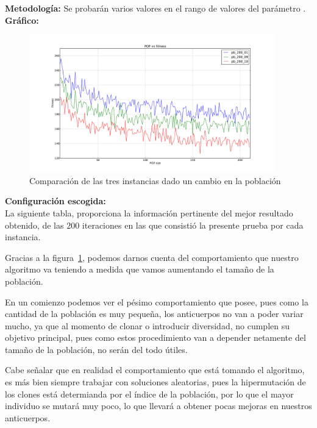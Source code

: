 \textbf{Metodología:} Se probarán varios valores en el rango de valores del parámetro \blue{[10,210]}.\\

\textbf{Gráfico:}\\

\begin{figure}[h!]
\begin{center}
	\includegraphics[width=0.95\textwidth]{img/1.pdf}
	\caption{Comparaci\'on de las tres instancias dado un cambio en la poblaci\'on}
	\label{fig:1}
\end{center}
\end{figure}

\textbf{Configuración escogida:}\\

La siguiente tabla, proporciona la información pertinente del mejor resultado obtenido,
de las $200$ iteraciones en las que consistió la presente prueba por cada instancia.

Gracias a la figura~\ref{fig:1}, podemos darnos cuenta del comportamiento que nuestro
algoritmo va teniendo a medida que vamos aumentando el tamaño de la población.

En un comienzo podemos ver el pésimo comportamiento que posee, pues como la cantidad de
la población es muy pequeña, los anticuerpos no van a poder variar mucho, ya que al
momento de clonar o introducir diversidad, no cumplen su objetivo principal, pues
como estos procedimiento van a depender netamente del tamaño de la población, no serán
del todo útiles.

Cabe señalar que en realidad el comportamiento que está tomando el algoritmo, es más
bien siempre trabajar con soluciones aleatorias, pues la hipermutación de los clones
está determianda por el índice de la población, por lo que el mayor individuo se mutará
muy poco, lo que llevará a obtener pocas mejoras en nuestros anticuerpos.



